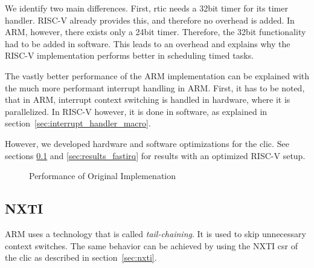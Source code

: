 We identify two main differences. First, \gls{rtic} needs a 32bit timer for its timer handler. RISC-V already provides this, and therefore no overhead is added. In ARM, however, there exists only a 24bit timer. Therefore, the 32bit functionality had to be added in software. This leads to an overhead and explains why the RISC-V implementation performs better in scheduling timed tasks.

The vastly better performance of the ARM implementation can be explained with the much more performant interrupt handling in ARM. First, it has to be noted, that in ARM, interrupt context switching is handled in hardware, where it is parallelized. In RISC-V however, it is done in software, as explained in section~\ref{sec:interrupt_handler_macro}.

However, we developed hardware and software optimizations for the \gls{clic}.
See sections \ref{sec:results_nxti} and \ref{sec:results_fastirq} for results with an optimized RISC-V setup.


\begin{figure}
\caption{Performance of Original Implemenation}
\label{fig:plot_original}
\end{figure}


\subsection{NXTI}
\label{sec:results_nxti}

ARM uses a technology that is called \emph{tail-chaining}. It is used to skip unnecessary context switches. The same behavior can be achieved by using the NXTI \gls{csr} of the \gls{clic} as described in section~\ref{sec:nxti}.


